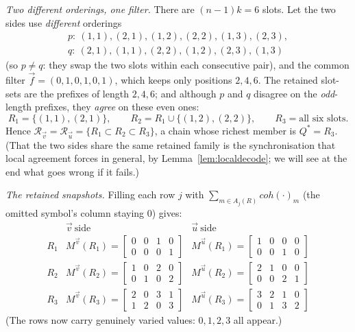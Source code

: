 \documentclass{article}
\begin{document}
\medskip\noindent\emph{Two different orderings, one filter.}
There are $(n-1)k=6$ slots.  Let the two sides use \emph{different} orderings
\begin{gather*}
p:\ (1,1),(2,1),(1,2),(2,2),(1,3),(2,3),\\
q:\ (2,1),(1,1),(2,2),(1,2),(2,3),(1,3)
\end{gather*}
(so $p\ne q$: they swap the two slots within each consecutive pair), and the common
filter $\vec f=(0,1,0,1,0,1)$, which keeps only positions $2,4,6$.  The retained
slot-sets are the prefixes of length $2,4,6$; and although $p$ and $q$ disagree on
the \emph{odd}-length prefixes, they \emph{agree} on these even ones:
\[
R_1=\{(1,1),(2,1)\},\qquad
R_2=R_1\cup\{(1,2),(2,2)\},\qquad
R_3=\text{all six slots}.
\]
Hence $\mathcal R_{\vec v}=\mathcal R_{\vec u}=\{R_1\subset R_2\subset R_3\}$, a
chain whose richest member is $Q^\ast=R_3$.  (That the two sides share the same
retained family is the synchronisation that local agreement forces in general, by
Lemma~\ref{lem:localdecode}; we will see at the end what goes wrong if it fails.)

\medskip\noindent\emph{The retained snapshots.}
Filling each row $j$ with $\sum_{m\in A_j(R)}coh(\cdot)_m$ (the omitted symbol's
column staying $0$) gives:
\[
\renewcommand{\arraystretch}{2.4}
\begin{array}{c|c|c}
 & \vec v\ \text{side} & \vec u\ \text{side}\\\hline
R_1 & M^{\vec v}(R_1)=\begin{bmatrix}0&0&1&0\\0&0&0&1\end{bmatrix}
    & M^{\vec u}(R_1)=\begin{bmatrix}1&0&0&0\\0&0&1&0\end{bmatrix}\\
R_2 & M^{\vec v}(R_2)=\begin{bmatrix}1&0&2&0\\0&1&0&2\end{bmatrix}
    & M^{\vec u}(R_2)=\begin{bmatrix}2&1&0&0\\0&0&2&1\end{bmatrix}\\
R_3 & M^{\vec v}(R_3)=\begin{bmatrix}2&0&3&1\\1&2&0&3\end{bmatrix}
    & M^{\vec u}(R_3)=\begin{bmatrix}3&2&1&0\\0&1&3&2\end{bmatrix}
\end{array}
\]
(The rows now carry genuinely varied values: $0,1,2,3$ all appear.)
\end{document}
